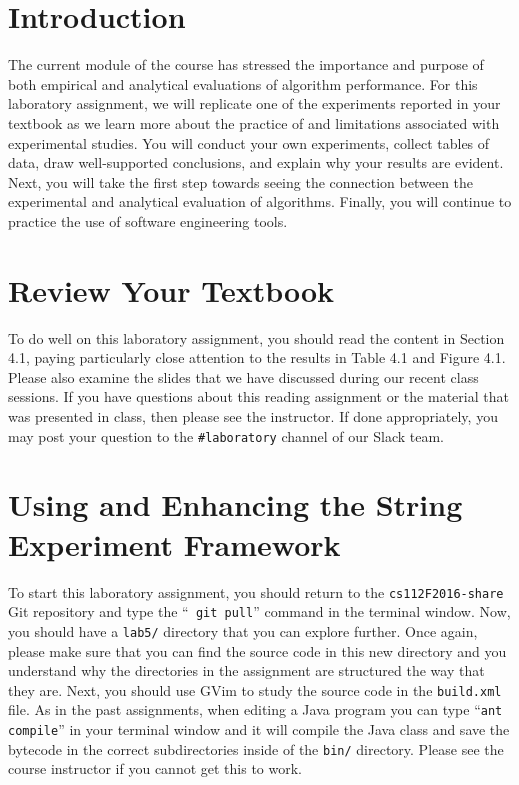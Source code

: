 

\usepackage[compact]{titlesec}


\section*{Introduction}

The current module of the course has stressed the importance and purpose of both empirical and analytical evaluations of
algorithm performance. For this laboratory assignment, we will replicate one of the experiments reported in your
textbook as we learn more about the practice of and limitations associated with experimental studies. You will conduct
your own experiments, collect tables of data, draw well-supported conclusions, and explain why your results are evident.
Next, you will take the first step towards seeing the connection between the experimental and analytical evaluation of
algorithms. Finally, you will continue to practice the use of software engineering tools.

\section*{Review Your Textbook}

To do well on this laboratory assignment, you should read the content in Section 4.1, paying particularly close
attention to the results in Table 4.1 and Figure 4.1. Please also examine the slides that we have discussed during our
recent class sessions. If you have questions about this reading assignment or the material that was presented in class,
then please see the instructor. If done appropriately, you may post your question to the {\tt \#laboratory} channel of
our Slack team.

\section*{Using and Enhancing the String Experiment Framework}

To start this laboratory assignment, you should return to the {\tt cs112F2016-share} Git repository and type the ``{\tt
git pull}'' command in the terminal window.  Now, you should have a {\tt lab5/} directory that you can explore further.
Once again, please make sure that you can find the source code in this new directory and you understand why the
directories in the assignment are structured the way that they are. Next, you should use GVim to study the source code
in the {\tt build.xml} file.  As in the past assignments, when editing a Java program you can type ``{\tt ant compile}''
in your terminal window and it will compile the Java class and save the bytecode in the correct subdirectories inside of
the {\tt bin/} directory. Please see the course instructor if you cannot get this to work.

